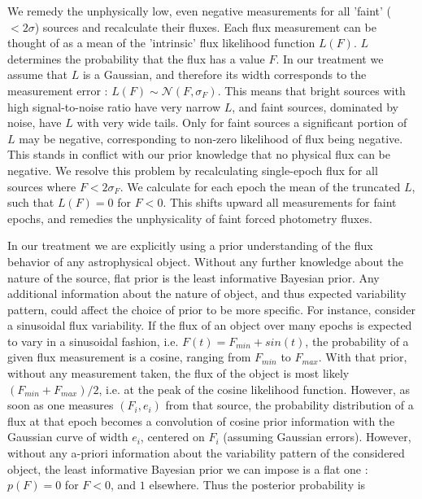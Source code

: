 \documentclass[fleqn,usenatbib]{mnras}  %
\begin{document}
%
%

We remedy the unphysically low, even negative measurements for all 'faint' ($< 2\sigma$) sources and recalculate their fluxes. Each flux measurement can  be thought of as a  mean of the 'intrinsic' flux likelihood function $L(F)$. $L$ determines the probability that the flux has a value $F$. In our treatment we assume that $L$ is a Gaussian, and therefore its width corresponds to the measurement error :  $L(F) \sim \mathcal{N}(F,\sigma_{F})$. This means that bright sources with high signal-to-noise ratio have very narrow  $L$, and faint sources, dominated by noise, have $L$ with very wide tails.  Only for faint sources a significant portion of $L$ may be negative, corresponding to non-zero likelihood of flux being negative. This stands in conflict with our prior knowledge that no physical flux can be negative. We resolve this problem by recalculating single-epoch flux for all sources where $F < 2 \sigma_{F}$. We calculate for each epoch the mean of the truncated $L$, such that $L(F) = 0$ for $F<0$.  This shifts upward all measurements for faint epochs, and remedies the unphysicality of faint forced photometry fluxes.   

%
%

In our treatment we are explicitly using a prior understanding of the flux behavior of any astrophysical object.  Without any further knowledge about the nature of the source, flat prior is the least informative Bayesian prior. Any additional information about the nature of object, and thus expected variability pattern,  could affect the choice of prior to be more specific. For instance,  consider a sinusoidal flux variability. If the flux of an object over many epochs is expected to vary in a sinusoidal fashion, i.e. $F(t) = F_{min}+ sin(t)$, the probability of a given  flux measurement is a cosine, ranging from $F_{min}$ to $F_{max}$. With that prior, without any measurement taken, the flux of the object is most likely  $(F_{min} + F_{max}) /  2$, i.e. at the peak of the cosine likelihood function. However, as soon as one measures $(F_{i},e_{i})$ from that source, the probability distribution of a flux at that epoch becomes a convolution of cosine prior information with the Gaussian curve of width $e_{i}$, centered on $F_{i}$ (assuming Gaussian errors). However, without any a-priori information about the variability pattern of the considered object, the least informative Bayesian prior we can impose is a flat one : $p(F)=0 $ for $F<0$, and $1$ elsewhere. Thus the posterior probability is 
\end{document}
